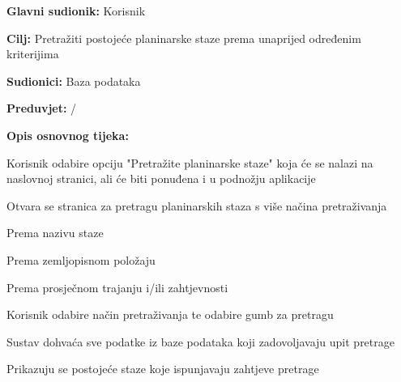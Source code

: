			\noindent {}
		\begin{packed_item}
			
			\item \textbf{Glavni sudionik: }$ $Korisnik$ $
			\item  \textbf{Cilj:} $ $Pretražiti postojeće planinarske staze prema unaprijed određenim kriterijima $ $
			\item  \textbf{Sudionici:} $ $Baza podataka$ $
			\item  \textbf{Preduvjet:} $ $/$ $
			\item  \textbf{Opis osnovnog tijeka:}
			
			\item[] \begin{packed_enum}
				
				\item $ $Korisnik odabire opciju "Pretražite planinarske staze" koja će se nalazi na naslovnoj stranici, ali će biti ponuđena i u podnožju aplikacije$ $
				\item $ $Otvara se stranica za pretragu planinarskih staza s više načina pretraživanja$ $
					\begin{packed_enum}
						\item Prema nazivu staze
						\item Prema zemljopisnom položaju
						\item Prema prosječnom trajanju i/ili zahtjevnosti
					\end{packed_enum}
				\item $ $Korisnik odabire način pretraživanja te odabire gumb za pretragu$ $
				\item $ $Sustav dohvaća sve podatke iz baze podataka koji zadovoljavaju upit pretrage $ $
				\item $ $Prikazuju se postojeće staze koje ispunjavaju zahtjeve pretrage$ $
				
			\end{packed_enum}
		\end{packed_item}
		
